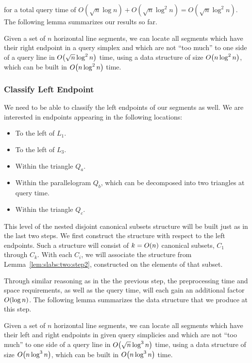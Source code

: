 \noindent for a total query time of $O(\sqrt{n}\log{n}) + O(\sqrt{n}\log^2{n}) = O(\sqrt{n}\log^2{n})$. The following lemma summarizes our results so far.

\begin{lemma}
\label{lem:slabs:two:step2}
Given a set of $n$ horizontal line segments, we can locate all segments which have their right endpoint in a query simplex and which are not ``too much'' to one side of a query line in $O\!\left(\sqrt{n}\log^2{n}\right)$ time, using a data structure of size $O\!\left(n\log^2{n}\right)$, which can be built in $O\!\left(n\log^2{n}\right)$ time.
\end{lemma}


\subsubsection{Classify Left Endpoint}

We need to be able to classify the left endpoints of our segments as well. We are interested in endpoints appearing in the following locations:

\begin{itemize}
 \item To the left of $L_1$.
 \item To the left of $L_3$.
 \item Within the triangle $Q_a$.
 \item Within the parallelogram $Q_b$, which can be decomposed into two triangles at query time.
 \item Within the triangle $Q_c$.
\end{itemize}

This level of the nested disjoint canonical subsets structure will be built just as in the last two steps.  We first construct the structure with respect to the left endpoints.  Such a structure will consist of $k = O\!\left(n\right)$ canonical subsets, $C_1$ through $C_k$. With each $C_i$, we will associate the structure from Lemma~\ref{lem:slabs:two:step2}, constructed on the elements of that subset.

Through similar reasoning as in the the previous step, the preprocessing time and space requirements, as well as the query time, will each gain an additional factor $O\!\left(\log{n}\right)$. The following lemma summarizes the data structure that we produce at this step.

\begin{lemma}
\label{lem:slabs:two:step3}
Given a set of $n$ horizontal line segments, we can locate all segments which have their left and right endpoints in given query simplicies and which are not ``too much'' to one side of a query line in $O\!\left(\sqrt{n}\log^3{n}\right)$ time, using a data structure of size $O\!\left(n\log^3{n}\right)$, which can be built in $O\!\left(n\log^3{n}\right)$ time.
\end{lemma}


